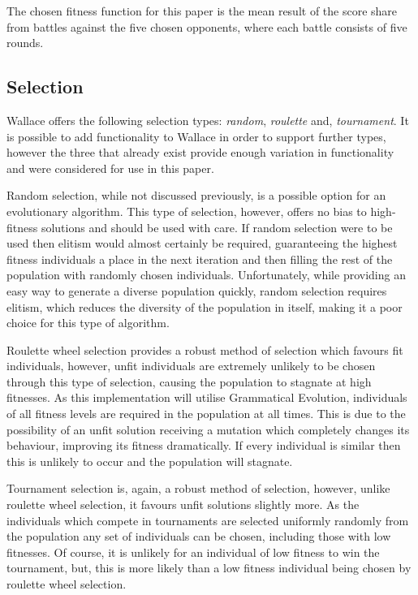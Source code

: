 \documentclass[a4paper, 12pt]{article}
\begin{document}
The chosen fitness function for this paper is the mean result of the score share from battles against the five chosen opponents, where each battle consists of five rounds. 

\subsection{Selection}

Wallace offers the following selection types: \textit{random}, \textit{roulette} and, \textit{tournament}. It is possible to add functionality to Wallace in order to support further types, however the three that already exist provide enough variation in functionality and were considered for use in this paper. 

Random selection, while not discussed previously, is a possible option for an evolutionary algorithm. This type of selection, however, offers no bias to high-fitness solutions and should be used with care. If random selection were to be used then elitism would almost certainly be required, guaranteeing the highest fitness individuals a place in the next iteration and then filling the rest of the population with randomly chosen individuals. Unfortunately, while providing an easy way to generate a diverse population quickly, random selection requires elitism, which reduces the diversity of the population in itself, making it a poor choice for this type of algorithm.

Roulette wheel selection provides a robust method of selection which favours fit individuals, however, unfit individuals are extremely unlikely to be chosen through this type of selection, causing the population to stagnate at high fitnesses. As this implementation will utilise Grammatical Evolution, individuals of all fitness levels are required in the population at all times. This is due to the possibility of an unfit solution receiving a mutation which completely changes its behaviour, improving its fitness dramatically. If every individual is similar then this is unlikely to occur and the population will stagnate. 

Tournament selection is, again, a robust method of selection, however, unlike roulette wheel selection, it favours unfit solutions slightly more. As the individuals which compete in tournaments are selected uniformly randomly from the population any set of individuals can be chosen, including those with low fitnesses. Of course, it is unlikely for an individual of low fitness to win the tournament, but, this is more likely than a low fitness individual being chosen by roulette wheel selection.
\end{document}
